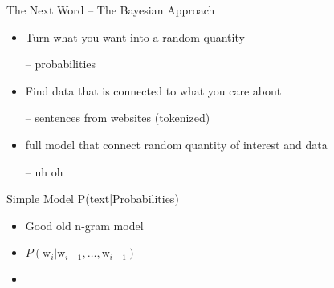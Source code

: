 \documentclass[11pt]{beamer}
\begin{document}
	\begin{frame}{The Next Word -- The Bayesian Approach}
		\centering
		\begin{itemize}
			\item Turn what you want into a random quantity

			-- probabilities \checkmark
			\item Find data that is connected to what you care about
			
			-- sentences from websites (tokenized) \checkmark
			\item full model that connect random quantity of interest and data
			
			-- uh oh
		\end{itemize}
	\end{frame}
	
	\begin{frame}{Simple Model P(text|Probabilities)}
		\begin{itemize}
			\item Good old n-gram model
			\item $P(\text{w}_i|\text{w}_{i-1},\dots,\text{w}_{i-1})$
			\item 
		\end{itemize}
	\end{frame}
	
\end{document}
